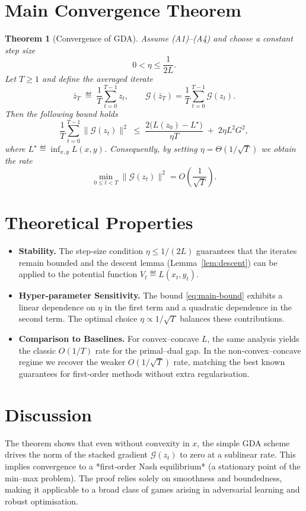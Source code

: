 \documentclass{article}
\newtheorem{theorem}{Theorem}
\begin{document}
\section*{Main Convergence Theorem}
\begin{theorem}[Convergence of GDA]\label{thm:main}
Assume (A1)–(A4) and choose a constant step size
\[
0<\eta\le\frac{1}{2L}.
\]
Let $T\ge1$ and define the averaged iterate
\[
\bar z_T\;\eqdef\;\frac{1}{T}\sum_{t=0}^{T-1}z_t,\qquad
\mathcal{G}(\bar z_T)=\frac{1}{T}\sum_{t=0}^{T-1}\mathcal{G}(z_t).
\]
Then the following bound holds
\begin{equation}\label{eq:main-bound}
\frac{1}{T}\sum_{t=0}^{T-1}\big\|\mathcal{G}(z_t)\big\|^2
\;\le\;
\frac{2\big(L(z_0)-L^\star\big)}{\eta T}
\;+\;
2\eta L^2 G^2,
\end{equation}
where $L^\star\eqdef \inf_{x,y}L(x,y)$. Consequently, by setting $\eta=\Theta(1/\sqrt{T})$ we obtain the rate
\[
\min_{0\le t<T}\big\|\mathcal{G}(z_t)\big\|^2 = O\!\left(\frac{1}{\sqrt{T}}\right).
\]
\end{theorem}

\section*{Theoretical Properties}
\begin{itemize}
\item \textbf{Stability.} The step‑size condition $\eta\le 1/(2L)$ guarantees that the iterates remain bounded and the descent lemma (Lemma~\ref{lem:descent}) can be applied to the potential function $V_t\eqdef L(x_t,y_t)$.
\item \textbf{Hyper‑parameter Sensitivity.} The bound \eqref{eq:main-bound} exhibits a linear dependence on $\eta$ in the first term and a quadratic dependence in the second term. The optimal choice $\eta\propto 1/\sqrt{T}$ balances these contributions.
\item \textbf{Comparison to Baselines.} For convex–concave $L$, the same analysis yields the classic $O(1/T)$ rate for the primal–dual gap. In the non‑convex–concave regime we recover the weaker $O(1/\sqrt{T})$ rate, matching the best known guarantees for first‑order methods without extra regularisation.
\end{itemize}

\section*{Discussion}
The theorem shows that even without convexity in $x$, the simple GDA scheme drives the norm of the stacked gradient $\mathcal{G}(z_t)$ to zero at a sublinear rate. This implies convergence to a *first‑order Nash equilibrium* (a stationary point of the min–max problem). The proof relies solely on smoothness and boundedness, making it applicable to a broad class of games arising in adversarial learning and robust optimisation.
\end{document}
